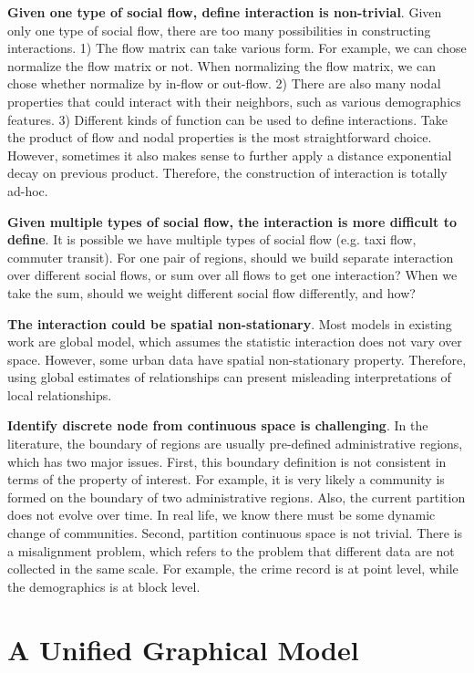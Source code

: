 \textbf{Given one type of social flow, define interaction is non-trivial}. Given only one type of social flow, there are too many possibilities in constructing interactions.   1) The flow matrix can take various form. For example, we can chose normalize the flow matrix or not. When normalizing the flow matrix, we can chose whether normalize by in-flow or out-flow. 
2) There are also many nodal properties that could interact with their neighbors, such as various demographics features. 
3) Different kinds of function can be used to define interactions. Take the product of flow and nodal properties is the most straightforward choice. However, sometimes it also makes sense to further apply a distance exponential decay on previous product.
Therefore, the construction of interaction is totally ad-hoc. 


\textbf{Given multiple types of social flow, the interaction is more difficult to define}. It is possible we have multiple types of social flow (e.g. taxi flow, commuter transit). For one pair of regions, should we build separate interaction over different social flows, or sum over all flows to get one interaction? When we take the sum, should we weight different social flow differently, and how?


\textbf{The interaction could be spatial non-stationary}. Most models in existing work are global model, which assumes the statistic interaction does not vary over space. However, some urban data have spatial non-stationary property. Therefore, using global estimates of relationships can present misleading interpretations of local relationships.



\textbf{Identify discrete node from continuous space is challenging}. In the literature, the boundary of regions are usually pre-defined administrative regions, which has two major issues. First, this boundary definition is not consistent in terms of the property of interest. For example, it is very likely a community is formed on the boundary of two administrative regions. Also, the current partition does not evolve over time. In real life, we know there must be some dynamic change of communities. Second, partition continuous space is not trivial. There is a misalignment problem, which refers to the problem that different data are not collected in the same scale. For example, the crime record is at point level, while the demographics is at block level.

\section{A Unified Graphical Model}

